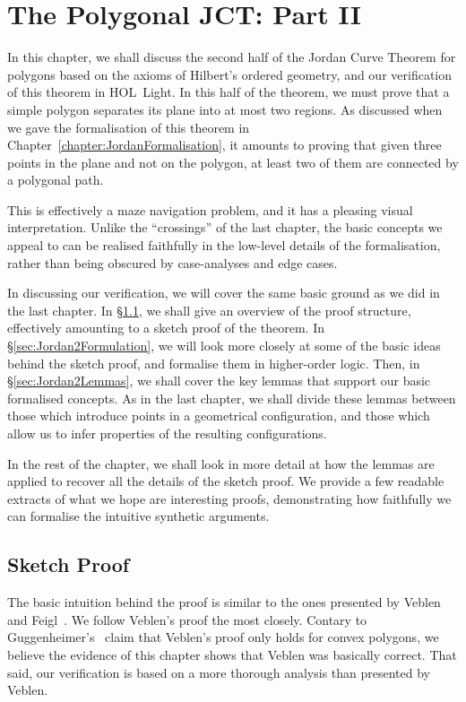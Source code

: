 \chapter{The Polygonal JCT: Part II}\label{chapter:JordanVerification2}
In this chapter, we shall discuss the second half of the Jordan Curve Theorem for polygons based on the axioms of Hilbert's ordered geometry, and our verification of this theorem in HOL~Light. In this half of the theorem, we must prove that a simple polygon separates its plane into at most two regions. As discussed when we gave the formalisation of this theorem in Chapter~\ref{chapter:JordanFormalisation}, it amounts to proving that given three points in the plane and not on the polygon, at least two of them are connected by a polygonal path.

This is effectively a maze navigation problem, and it has a pleasing visual interpretation. Unlike the ``crossings'' of the last chapter, the basic concepts we appeal to can be realised faithfully in the low-level details of the formalisation, rather than being obscured by case-analyses and edge cases. 

In discussing our verification, we will cover the same basic ground as we did in the last chapter. In \S\ref{sec:SketchProofJordan2}, we shall give an overview of the proof structure, effectively amounting to a sketch proof of the theorem. In \S\ref{sec:Jordan2Formulation}, we will look more closely at some of the basic ideas behind the sketch proof, and formalise them in higher-order logic. Then, in \S\ref{sec:Jordan2Lemmas}, we shall cover the key lemmas that support our basic formalised concepts. As in the last chapter, we shall divide these lemmas between those which introduce points in a geometrical configuration, and those which allow us to infer properties of the resulting configurations. 

In the rest of the chapter, we shall look in more detail at how the lemmas are applied to recover all the details of the sketch proof. We provide a few readable extracts of what we hope are interesting proofs, demonstrating how faithfully we can formalise the intuitive synthetic arguments.

\section{Sketch Proof}\label{sec:SketchProofJordan2}
The basic intuition behind the proof is similar to the ones presented by Veblen~\cite{Veblenphd} and Feigl~\cite{FeiglJordan}. We follow Veblen's proof the most closely. Contary to Guggenheimer's~\cite{GuggenheimerJordanCurve} claim that Veblen's proof only holds for convex polygons, we believe the evidence of this chapter shows that Veblen was basically correct. That said, our verification is based on a more thorough analysis than presented by Veblen.


